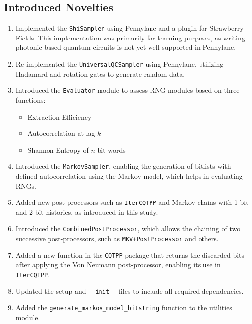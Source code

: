 \subsection{Introduced Novelties}
\begin{enumerate}
    \item Implemented the \texttt{ShiSampler} using Pennylane and a plugin for Strawberry Fields. This implementation was primarily for learning purposes, as writing photonic-based quantum circuits is not yet well-supported in Pennylane.
    \item Re-implemented the \texttt{UniversalQCSampler} using Pennylane, utilizing Hadamard and rotation gates to generate random data.
    \item Introduced the \texttt{Evaluator} module to assess RNG modules based on three functions:
    \begin{itemize}
        \item Extraction Efficiency
        \item Autocorrelation at lag \(k\)
        \item Shannon Entropy of \(n\)-bit words
    \end{itemize}
    \item Introduced the \texttt{MarkovSampler}, enabling the generation of bitlists with defined autocorrelation using the Markov model, which helps in evaluating RNGs.
    \item Added new post-processors such as \texttt{IterCQTPP} and Markov chains with 1-bit and 2-bit histories, as introduced in this study.
    \item Introduced the \texttt{CombinedPostProcessor}, which allows the chaining of two successive post-processors, such as \texttt{MKV+PostProcessor} and others.
    \item Added a new function in the \texttt{CQTPP} package that returns the discarded bits after applying the Von Neumann post-processor, enabling its use in \texttt{IterCQTPP}.
    \item Updated the setup and \texttt{\_\_init\_\_} files to include all required dependencies.
    \item Added the \texttt{generate\_markov\_model\_bitstring} function to the utilities module.
\end{enumerate}
